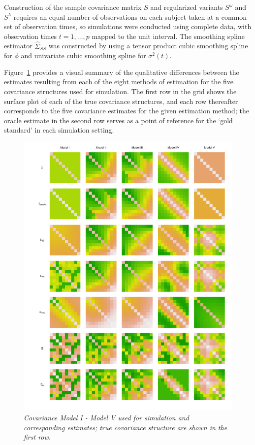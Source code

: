 \documentclass[12pt]{article}
\begin{document}
Construction of the sample covariance matrix $S$ and regularized variants $S^\omega$ and $S^\lambda$ requires an equal number of observations on each subject taken at a common set of observation times, so simulations were conducted using complete data, with observation times $t = 1, \dots, p$ mapped to the unit interval. The smoothing spline estimator $\hat{\Sigma}_{SS}$ was constructed by using a tensor product cubic smoothing spline for $\phi$ and univariate cubic smoothing spline for $\sigma^2\left(t\right)$.

Figure~\ref{fig:cov-estimate-lattice} provides a visual summary of the qualitative differences between the estimates resulting from each of the eight methods of estimation for the five covariance structures used for simulation. The first row in the grid shows the surface plot of each of the true covariance structures, and each row thereafter corresponds to the five covariance estimates for the given estimation method; the oracle estimate in the second row serves as a point of reference for the `gold standard' in each simulation setting. 
\begin{figure}[H] 
\centering
  \includegraphics[width = 1\textwidth]{img/cov-estimate-lattice}
  \vspace*{-10mm}
  \caption{\textit{Covariance Model I - Model V used for simulation and corresponding estimates; true covariance structure are shown in the first row.}}\label{fig:cov-estimate-lattice}
\end{figure}
\end{document}
